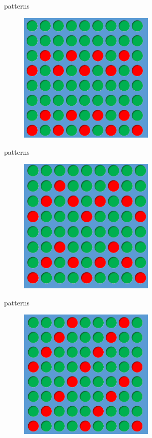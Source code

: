 \documentclass[11pt,compress,xcolor=x11names,UTF8]{beamer}
\begin{document}
\begin{frame}{patterns}
\begin{figure}
\centering
\includegraphics[width=0.58\textwidth]{pat4} %
\end{figure}

\end{frame}
\begin{frame}{patterns}
\begin{figure}
\centering
\includegraphics[width=0.58\textwidth]{pat5} %
\end{figure}

\end{frame}
\begin{frame}{patterns}
\begin{figure}
\centering
\includegraphics[width=0.58\textwidth]{pat6} %
\end{figure}

\end{frame}
\end{document}
